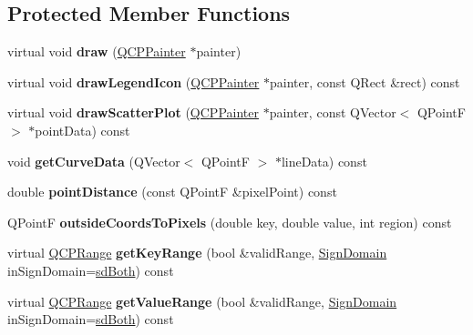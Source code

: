 \subsection*{Protected Member Functions}
\begin{DoxyCompactItemize}
\item 
\hypertarget{classQCPCurve_a2361302d2fc6ec669849bd3bca00c4b2}{virtual void {\bfseries draw} (\hyperlink{classQCPPainter}{Q\-C\-P\-Painter} $\ast$painter)}\label{classQCPCurve_a2361302d2fc6ec669849bd3bca00c4b2}

\item 
\hypertarget{classQCPCurve_a8e9b46de865a9f07cc9d62c904ab8198}{virtual void {\bfseries draw\-Legend\-Icon} (\hyperlink{classQCPPainter}{Q\-C\-P\-Painter} $\ast$painter, const Q\-Rect \&rect) const }\label{classQCPCurve_a8e9b46de865a9f07cc9d62c904ab8198}

\item 
\hypertarget{classQCPCurve_a45593f30b81beec4b6130b6b53306087}{virtual void {\bfseries draw\-Scatter\-Plot} (\hyperlink{classQCPPainter}{Q\-C\-P\-Painter} $\ast$painter, const Q\-Vector$<$ Q\-Point\-F $>$ $\ast$point\-Data) const }\label{classQCPCurve_a45593f30b81beec4b6130b6b53306087}

\item 
\hypertarget{classQCPCurve_afa895f8ba9ae34fea6ecea295fd7b1e5}{void {\bfseries get\-Curve\-Data} (Q\-Vector$<$ Q\-Point\-F $>$ $\ast$line\-Data) const }\label{classQCPCurve_afa895f8ba9ae34fea6ecea295fd7b1e5}

\item 
\hypertarget{classQCPCurve_acd7a68c6f268ce1ab845eaf69fc2c6a6}{double {\bfseries point\-Distance} (const Q\-Point\-F \&pixel\-Point) const }\label{classQCPCurve_acd7a68c6f268ce1ab845eaf69fc2c6a6}

\item 
\hypertarget{classQCPCurve_aec2099a1569775209f73bbb0d3da7c16}{Q\-Point\-F {\bfseries outside\-Coords\-To\-Pixels} (double key, double value, int region) const }\label{classQCPCurve_aec2099a1569775209f73bbb0d3da7c16}

\item 
\hypertarget{classQCPCurve_aed062a72e98372480a683cdd201b5612}{virtual \hyperlink{classQCPRange}{Q\-C\-P\-Range} {\bfseries get\-Key\-Range} (bool \&valid\-Range, \hyperlink{classQCPAbstractPlottable_a661743478a1d3c09d28ec2711d7653d8}{Sign\-Domain} in\-Sign\-Domain=\hyperlink{classQCPAbstractPlottable_a661743478a1d3c09d28ec2711d7653d8a082b98cfb91a7363a3b5cd17b0c1cd60}{sd\-Both}) const }\label{classQCPCurve_aed062a72e98372480a683cdd201b5612}

\item 
\hypertarget{classQCPCurve_a5e788d369793e0179c5a46fce3bcb0fb}{virtual \hyperlink{classQCPRange}{Q\-C\-P\-Range} {\bfseries get\-Value\-Range} (bool \&valid\-Range, \hyperlink{classQCPAbstractPlottable_a661743478a1d3c09d28ec2711d7653d8}{Sign\-Domain} in\-Sign\-Domain=\hyperlink{classQCPAbstractPlottable_a661743478a1d3c09d28ec2711d7653d8a082b98cfb91a7363a3b5cd17b0c1cd60}{sd\-Both}) const }\label{classQCPCurve_a5e788d369793e0179c5a46fce3bcb0fb}

\end{DoxyCompactItemize}
